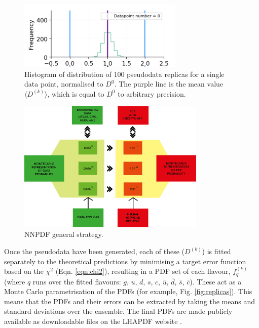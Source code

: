 \begin{figure}
\centering
\includegraphics[width=0.7\textwidth]{background/datarepchorus.png}
\caption{Histogram of distribution of 100 pseudodata replicas for a single data point, normalised to $D^0$. The purple line is the mean value $\langle D^{(k)} \rangle$, which is equal to $D^0$ to arbitrary precision.}
\label{fig:datarepchorus}
\end{figure}
\begin{figure}
\centering
\includegraphics[width=0.8\textwidth]{background/generalstrategy.png}
\caption{NNPDF general strategy.}
\label{fig:generalstrategy}
\end{figure}
Once the pseudodata have been generated, each of these ($D^{(k)}$) is fitted separately to the theoretical predictions by minimising a target error function based on the $\chi^2$ (Eqn. \ref{eqn:chi2}), resulting in a PDF set of each flavour, $f_q^{(k)}$ (where $q$ runs over the fitted flavours: $g$, $u$, $d$, $s$, $c$, $\bar{u}$, $\bar{d}$, $\bar{s}$, $\bar{c}$). These act as a Monte Carlo parametrisation of the PDFs (for example, Fig. \ref{fig:replicas}).  This means that the PDFs and their errors can be extracted by taking the means and standard deviations over the ensemble. The final PDFs are made publicly available as downloadable files on the LHAPDF website \cite{lhapdf, Buckley:2014ana}. 

